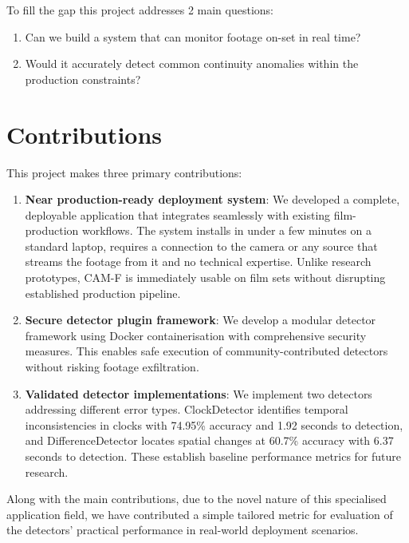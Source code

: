 To fill the gap this project addresses 2 main questions:
\begin{enumerate}
\item Can we build a system that can monitor footage on-set in real time?
\item Would it accurately detect common continuity anomalies within the production constraints?
\end{enumerate}

\section{Contributions}
\label{sec:contributions}

This project makes three primary contributions:

\begin{enumerate}
\item \textbf{Near production-ready deployment system}: We developed a complete, deployable application that integrates seamlessly with existing film-production workflows. The system installs in under a few minutes on a standard laptop, requires a connection to the camera or any source that streams the footage from it and no technical expertise. Unlike research prototypes, CAM-F is immediately usable on film sets without disrupting established production pipeline.

\item \textbf{Secure detector plugin framework}: We develop a modular detector framework using Docker containerisation with comprehensive security measures. This enables safe execution of community-contributed detectors without risking footage exfiltration.

\item \textbf{Validated detector implementations}: We implement two detectors addressing different error types. ClockDetector identifies temporal inconsistencies in clocks with 74.95\% accuracy and 1.92 seconds to detection, and DifferenceDetector locates spatial changes at 60.7\% accuracy with 6.37 seconds to detection. These establish baseline performance metrics for future research.
\end{enumerate}

Along with the main contributions, due to the novel nature of this specialised application field, we have contributed a simple tailored metric for evaluation of the detectors' practical performance in real-world deployment scenarios.

